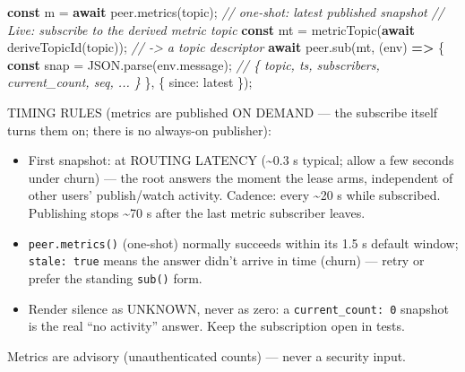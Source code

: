 \documentclass[
  nobib]{tufte-handout}
\newenvironment{Shaded}{}{}
\newcommand{\AttributeTok}[1]{\textcolor[rgb]{0.49,0.56,0.16}{#1}}
\newcommand{\BuiltInTok}[1]{\textcolor[rgb]{0.00,0.50,0.00}{#1}}
\newcommand{\CommentTok}[1]{\textcolor[rgb]{0.38,0.63,0.69}{\textit{#1}}}
\newcommand{\ControlFlowTok}[1]{\textcolor[rgb]{0.00,0.44,0.13}{\textbf{#1}}}
\newcommand{\DataTypeTok}[1]{\textcolor[rgb]{0.56,0.13,0.00}{#1}}
\newcommand{\FunctionTok}[1]{\textcolor[rgb]{0.02,0.16,0.49}{#1}}
\newcommand{\KeywordTok}[1]{\textcolor[rgb]{0.00,0.44,0.13}{\textbf{#1}}}
\newcommand{\NormalTok}[1]{#1}
\newcommand{\OperatorTok}[1]{\textcolor[rgb]{0.40,0.40,0.40}{#1}}
\newcommand{\StringTok}[1]{\textcolor[rgb]{0.25,0.44,0.63}{#1}}
\providecommand{\tightlist}{%
  \setlength{\itemsep}{0pt}\setlength{\parskip}{0pt}}
\begin{document}
\begin{Shaded}
\begin{Highlighting}[]
\KeywordTok{const}\NormalTok{ m }\OperatorTok{=} \ControlFlowTok{await}\NormalTok{ peer}\OperatorTok{.}\FunctionTok{metrics}\NormalTok{(topic)}\OperatorTok{;}   \CommentTok{// one{-}shot: latest published snapshot}
\CommentTok{// Live: subscribe to the derived metric topic}
\KeywordTok{const}\NormalTok{ mt }\OperatorTok{=} \FunctionTok{metricTopic}\NormalTok{(}\ControlFlowTok{await} \FunctionTok{deriveTopicId}\NormalTok{(topic))}\OperatorTok{;}    \CommentTok{// {-}\textgreater{} a topic descriptor}
\ControlFlowTok{await}\NormalTok{ peer}\OperatorTok{.}\FunctionTok{sub}\NormalTok{(mt}\OperatorTok{,}\NormalTok{ (env) }\KeywordTok{=\textgreater{}}\NormalTok{ \{}
  \KeywordTok{const}\NormalTok{ snap }\OperatorTok{=} \BuiltInTok{JSON}\OperatorTok{.}\FunctionTok{parse}\NormalTok{(env}\OperatorTok{.}\AttributeTok{message}\NormalTok{)}\OperatorTok{;} \CommentTok{// \{ topic, ts, subscribers, current\_count, seq, ... \}}
\NormalTok{\}}\OperatorTok{,}\NormalTok{ \{ }\DataTypeTok{since}\OperatorTok{:} \StringTok{\textquotesingle{}latest\textquotesingle{}}\NormalTok{ \})}\OperatorTok{;}
\end{Highlighting}
\end{Shaded}

TIMING RULES (metrics are published ON DEMAND --- the subscribe itself
turns them on; there is no always-on publisher):

\begin{itemize}
\tightlist
\item
  First snapshot: at ROUTING LATENCY (\textasciitilde0.3 s typical;
  allow a few seconds under churn) --- the root answers the moment the
  lease arms, independent of other users' publish/watch activity.
  Cadence: every \textasciitilde20 s while subscribed. Publishing stops
  \textasciitilde70 s after the last metric subscriber leaves.
\item
  \texttt{peer.metrics()} (one-shot) normally succeeds within its 1.5 s
  default window; \texttt{stale:\ true} means the answer didn't arrive
  in time (churn) --- retry or prefer the standing \texttt{sub()} form.
\item
  Render silence as UNKNOWN, never as zero: a
  \texttt{current\_count:\ 0} snapshot is the real ``no activity''
  answer. Keep the subscription open in tests.
\end{itemize}

Metrics are advisory (unauthenticated counts) --- never a security
input.
\end{document}
